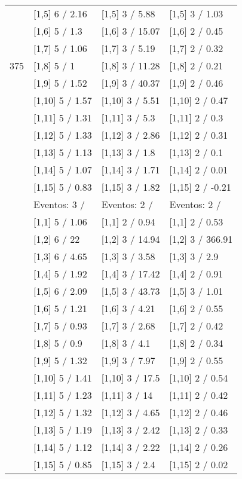 \begin{table}
\begin{tabular}[t]{llll}
 & {}[1,5] 6  / 2.16 & {}[1,5] 3  / 5.88 & {}[1,5] 3  / 1.03\\
 & {}[1,6] 5  / 1.3 & {}[1,6] 3  / 15.07 & {}[1,6] 2  / 0.45\\
 & {}[1,7] 5  / 1.06 & {}[1,7] 3  / 5.19 & {}[1,7] 2  / 0.32\\
375 & {}[1,8] 5  / 1 & {}[1,8] 3  / 11.28 & {}[1,8] 2  / 0.21\\
\addlinespace
 & {}[1,9] 5  / 1.52 & {}[1,9] 3  / 40.37 & {}[1,9] 2  / 0.46\\
 & {}[1,10] 5  / 1.57 & {}[1,10] 3  / 5.51 & {}[1,10] 2  / 0.47\\
 & {}[1,11] 5  / 1.31 & {}[1,11] 3  / 5.3 & {}[1,11] 2  / 0.3\\
 & {}[1,12] 5  / 1.33 & {}[1,12] 3  / 2.86 & {}[1,12] 2  / 0.31\\
 & {}[1,13] 5  / 1.13 & {}[1,13] 3  / 1.8 & {}[1,13] 2  / 0.1\\
\addlinespace
 & {}[1,14] 5  / 1.07 & {}[1,14] 3  / 1.71 & {}[1,14] 2  / 0.01\\
 & {}[1,15] 5  / 0.83 & {}[1,15] 3  / 1.82 & {}[1,15] 2  / -0.21\\
 & Eventos:  3 / & Eventos:  2 / & Eventos:  2 /\\
 & {}[1,1] 5  / 1.06 & {}[1,1] 2  / 0.94 & {}[1,1] 2  / 0.53\\
 & {}[1,2] 6  / 22 & {}[1,2] 3  / 14.94 & {}[1,2] 3  / 366.91\\
\addlinespace
 & {}[1,3] 6  / 4.65 & {}[1,3] 3  / 3.58 & {}[1,3] 3  / 2.9\\
 & {}[1,4] 5  / 1.92 & {}[1,4] 3  / 17.42 & {}[1,4] 2  / 0.91\\
 & {}[1,5] 6  / 2.09 & {}[1,5] 3  / 43.73 & {}[1,5] 3  / 1.01\\
 & {}[1,6] 5  / 1.21 & {}[1,6] 3  / 4.21 & {}[1,6] 2  / 0.55\\
 & {}[1,7] 5  / 0.93 & {}[1,7] 3  / 2.68 & {}[1,7] 2  / 0.42\\
\addlinespace
500 & {}[1,8] 5  / 0.9 & {}[1,8] 3  / 4.1 & {}[1,8] 2  / 0.34\\
 & {}[1,9] 5  / 1.32 & {}[1,9] 3  / 7.97 & {}[1,9] 2  / 0.55\\
 & {}[1,10] 5  / 1.41 & {}[1,10] 3  / 17.5 & {}[1,10] 2  / 0.54\\
 & {}[1,11] 5  / 1.23 & {}[1,11] 3  / 14 & {}[1,11] 2  / 0.42\\
 & {}[1,12] 5  / 1.32 & {}[1,12] 3  / 4.65 & {}[1,12] 2  / 0.46\\
\addlinespace
 & {}[1,13] 5  / 1.19 & {}[1,13] 3  / 2.42 & {}[1,13] 2  / 0.33\\
 & {}[1,14] 5  / 1.12 & {}[1,14] 3  / 2.22 & {}[1,14] 2  / 0.26\\
 & {}[1,15] 5  / 0.85 & {}[1,15] 3  / 2.4 & {}[1,15] 2  / 0.02\\
\bottomrule
\end{tabular}
\end{table}
